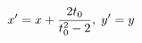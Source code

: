 \documentclass[preview]{standalone}
\begin{document}
\begin{align*}
\special{dvisvgm:raw <g id='unique000'>}x'=x+\frac{2t_0}{t_0^2-2},\; y'=y\special{dvisvgm:raw </g>}
\end{align*}
\end{document}
